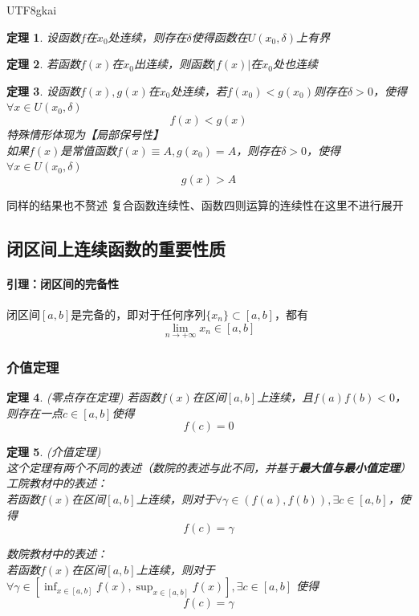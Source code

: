 \documentclass{article}
\newtheorem{theorem}{定理}[subsection]
\begin{document}
\begin{CJK}{UTF8}{gkai}
\begin{theorem}
设函数$f$在$x_0$处连续，则存在$\delta$使得函数在$U(x_0,\delta)$上有界\\
\end{theorem}
\begin{theorem}
若函数$f(x)$在$x_0$出连续，则函数$|f(x)|$在$x_0$处也连续\\
\end{theorem}
\begin{theorem}
设函数$f(x),g(x)$在$x_0$处连续，若$f(x_0)<g(x_0)$则存在$\delta>0$，使得$\forall x\in U(x_0,\delta)$\\
\[f(x)<g(x)\] 
特殊情形体现为【局部保号性】\\
如果$f(x)$是常值函数$f(x)\equiv A,g(x_0)=A$，则存在$\delta>0$，使得$\forall x\in U(x_0,\delta)$\\
\[g(x)>A\] 
\end{theorem}
同样的结果也不赘述
复合函数连续性、函数四则运算的连续性在这里不进行展开\\
\subsection{闭区间上连续函数的重要性质}


\paragraph{引理：闭区间的完备性\\}
闭区间$[a,b]$是完备的，即对于任何序列$\{x_n\}\subset [a,b]$，都有
\[\lim_{n\to +\infty}x_n\in [a,b]\]

\subsubsection{介值定理}
\begin{theorem}(零点存在定理)
若函数$f(x)$在区间$[a,b]$上连续，且$f(a)f(b)<0$，则存在一点$c\in[a,b]$使得
\[f(c)=0\]
\end{theorem}

\begin{theorem}(介值定理)\\
这个定理有两个不同的表述（数院的表述与此不同，并基于\textbf{最大值与最小值定理}）\\
工院教材中的表述：\\
若函数$f(x)$在区间$[a,b]$上连续，则对于$\forall \gamma\in(f(a),f(b)),\exists c\in[a,b]$，使得
\[f(c)=\gamma\]

数院教材中的表述：\\
若函数$f(x)$在区间$[a,b]$上连续，则对于$\forall \gamma\in[\inf_{x\in[a,b]}f(x),\sup_{x\in[a,b]}f(x)],\exists c\in [a,b]$
使得
\[f(c)=\gamma\]
\end{theorem}


\end{CJK}
\end{document}
